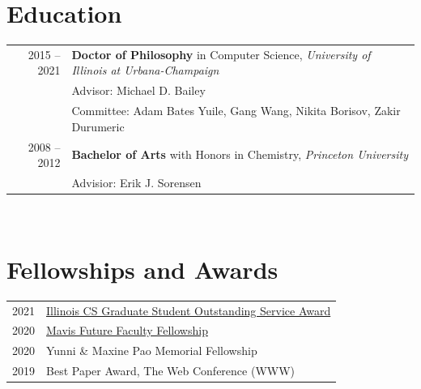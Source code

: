 \documentclass[10pt,singlecolumn]{article} %
\begin{document}
	  



\vspace{0.3cm}
\section{Education} 

\begin{tabular}{rl} %


2015 -- 2021 & \textbf{Doctor of Philosophy} in Computer Science, \emph{University of Illinois at Urbana-Champaign}\\ 
& Advisor: Michael D. Bailey \\
& Committee: Adam Bates Yuile, Gang Wang, Nikita Borisov, Zakir Durumeric \\
	 

2008 -- 2012 & \textbf{Bachelor of Arts} with Honors in Chemistry,  \emph{Princeton University}\\
& Advisior: Erik J. Sorensen \\
	  
\end{tabular} \\

\section{Fellowships and Awards} 

\begin{tabular}{rl}

2021 & \href{https://cs.illinois.edu/about/awards/graduate-fellowships-awards/graduate-student-outstanding-service-award}{Illinois CS Graduate Student Outstanding Service Award} \\ 

2020 & \href{https://mavis.grainger.illinois.edu/}{Mavis Future Faculty Fellowship} \\

2020 & Yunni \& Maxine Pao Memorial Fellowship \\

2019 & Best Paper Award, The Web Conference (WWW) \\
\end{tabular}\\
\end{document}
